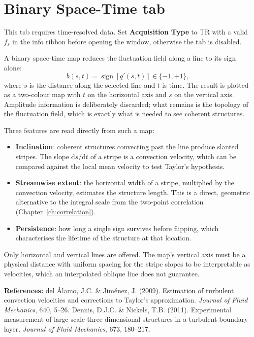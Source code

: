 \documentclass[11pt, a4paper]{report}
\newcommand{\uipth}[1]{\textbf{\textcolor{upblue}{#1}}}
\begin{document}
\section{Binary Space-Time tab}

\begin{notebox}
This tab requires time-resolved data. Set \uipth{Acquisition Type} to TR with a valid $f_s$ in the info ribbon before opening the window, otherwise the tab is disabled.
\end{notebox}

A binary space-time map reduces the fluctuation field along a line to its sign alone:
\[
b(s, t) = \operatorname{sign}\!\left[q'(s, t)\right] \in \{-1, +1\},
\]
where $s$ is the distance along the selected line and $t$ is time. The result is plotted as a two-colour map with $t$ on the horizontal axis and $s$ on the vertical axis. Amplitude information is deliberately discarded; what remains is the topology of the fluctuation field, which is exactly what is needed to see coherent structures.

Three features are read directly from such a map:

\begin{itemize}[leftmargin=1.5em]
  \item \textbf{Inclination}: coherent structures convecting past the line produce slanted stripes. The slope $\mathrm{d}s/\mathrm{d}t$ of a stripe is a convection velocity, which can be compared against the local mean velocity to test Taylor's hypothesis.
  \item \textbf{Streamwise extent}: the horizontal width of a stripe, multiplied by the convection velocity, estimates the structure length. This is a direct, geometric alternative to the integral scale from the two-point correlation (Chapter~\ref{ch:correlation}).
  \item \textbf{Persistence}: how long a single sign survives before flipping, which characterises the lifetime of the structure at that location.
\end{itemize}

Only horizontal and vertical lines are offered. The map's vertical axis must be a physical distance with uniform spacing for the stripe slopes to be interpretable as velocities, which an interpolated oblique line does not guarantee.

\noindent\textbf{References:} del \'Alamo, J.C. \& Jim\'enez, J. (2009). Estimation of turbulent convection velocities and corrections to Taylor's approximation. \textit{Journal of Fluid Mechanics}, 640, 5--26. Dennis, D.J.C. \& Nickels, T.B. (2011). Experimental measurement of large-scale three-dimensional structures in a turbulent boundary layer. \textit{Journal of Fluid Mechanics}, 673, 180--217.
\end{document}

